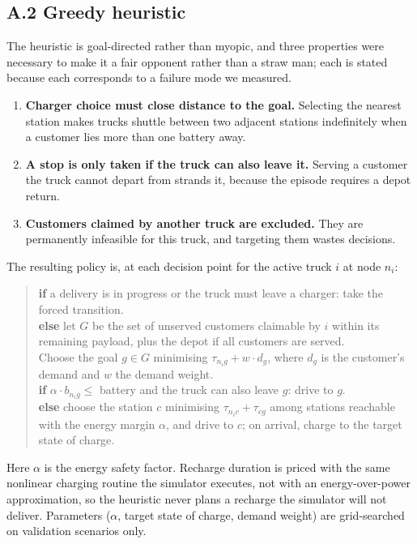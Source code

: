 \documentclass[a4paper,fleqn]{cas-sc}
\begin{document}
\subsection*{A.2 Greedy heuristic}

The heuristic is goal-directed rather than myopic, and three properties were
necessary to make it a fair opponent rather than a straw man; each is stated
because each corresponds to a failure mode we measured.

\begin{enumerate}[leftmargin=*,nosep]
\item \textbf{Charger choice must close distance to the goal.} Selecting the
nearest station makes trucks shuttle between two adjacent stations indefinitely
when a customer lies more than one battery away.
\item \textbf{A stop is only taken if the truck can also leave it.} Serving a
customer the truck cannot depart from strands it, because the episode requires a
depot return.
\item \textbf{Customers claimed by another truck are excluded.} They are
permanently infeasible for this truck, and targeting them wastes decisions.
\end{enumerate}

\noindent The resulting policy is, at each decision point for the active truck
$i$ at node $n_i$:

\begin{quote}
\small
\textbf{if} a delivery is in progress or the truck must leave a charger:
  take the forced transition.\\
\textbf{else} let $G$ be the set of unserved customers claimable by $i$ within
its remaining payload, plus the depot if all customers are served.\\
\quad Choose the goal $g\in G$ minimising
$\tau_{n_i g} + w\cdot d_g$, where $d_g$ is the customer's demand and $w$ the
demand weight.\\
\quad \textbf{if} $\alpha\cdot b_{n_i g} \le$ battery and the truck can also
leave $g$: drive to $g$.\\
\quad \textbf{else} choose the station $c$ minimising
$\tau_{n_i c} + \tau_{c g}$ among stations reachable with the energy margin
$\alpha$, and drive to $c$; on arrival, charge to the target state of charge.
\end{quote}

\noindent Here $\alpha$ is the energy safety factor. Recharge duration is priced
with the same nonlinear charging routine the simulator executes, not with an
energy-over-power approximation, so the heuristic never plans a recharge the
simulator will not deliver. Parameters ($\alpha$, target state of charge, demand
weight) are grid-searched on validation scenarios only.
\end{document}
